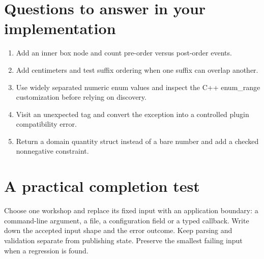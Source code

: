 \section*{Questions to answer in your implementation}
\begin{enumerate}
\item Add an inner box node and count pre-order versus post-order events.
\item Add centimeters and test suffix ordering when one suffix can overlap another.
\item Use widely separated numeric enum values and inspect the C++ enum\_range customization before relying on discovery.
\item Visit an unexpected tag and convert the exception into a controlled plugin compatibility error.
\item Return a domain quantity struct instead of a bare number and add a checked nonnegative constraint.
\end{enumerate}
\section*{A practical completion test}
Choose one workshop and replace its fixed input with an application boundary: a command-line argument, a file, a configuration field or a typed callback. Write down the accepted input shape and the error outcome. Keep parsing and validation separate from publishing state. Preserve the smallest failing input when a regression is found.


